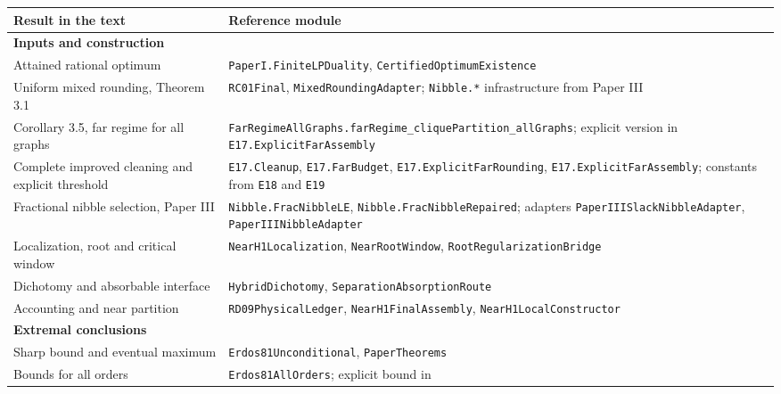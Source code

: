 \documentclass[english,11pt,a4paper]{article}
\newcounter{none}
\begin{document}
{\def\LTcaptype{none} %
\begin{longtable}[]{@{}
  >{\raggedright\arraybackslash}p{}
  >{\raggedright\arraybackslash}p{}@{}}
\toprule\noalign{}
\begin{minipage}[b]{\linewidth}\raggedright
Result in the text
\end{minipage} & \begin{minipage}[b]{\linewidth}\raggedright
Reference module
\end{minipage} \\
\midrule\noalign{}
\endhead
\bottomrule\noalign{}
\endlastfoot
\textbf{Inputs and construction} & \\
Attained rational optimum & \nolinkurl{PaperI.FiniteLPDuality},
\nolinkurl{CertifiedOptimumExistence} \\
Uniform mixed rounding, Theorem 3.1 & \nolinkurl{RC01Final},
\nolinkurl{MixedRoundingAdapter}; \nolinkurl{Nibble.*} infrastructure from
Paper III \\
Corollary 3.5, far regime for all graphs &
\nolinkurl{FarRegimeAllGraphs.farRegime_cliquePartition_allGraphs};
explicit version in \nolinkurl{E17.ExplicitFarAssembly} \\
Complete improved cleaning and explicit threshold &
\nolinkurl{E17.Cleanup}, \nolinkurl{E17.FarBudget},
\nolinkurl{E17.ExplicitFarRounding}, \nolinkurl{E17.ExplicitFarAssembly};
constants from \nolinkurl{E18} and \nolinkurl{E19} \\
Fractional nibble selection, Paper III & \nolinkurl{Nibble.FracNibbleLE},
\nolinkurl{Nibble.FracNibbleRepaired}; adapters
\nolinkurl{PaperIIISlackNibbleAdapter}, \nolinkurl{PaperIIINibbleAdapter} \\
Localization, root and critical window & \nolinkurl{NearH1Localization},
\nolinkurl{NearRootWindow}, \nolinkurl{RootRegularizationBridge} \\
Dichotomy and absorbable interface & \nolinkurl{HybridDichotomy},
\nolinkurl{SeparationAbsorptionRoute} \\
Accounting and near partition & \nolinkurl{RD09PhysicalLedger},
\nolinkurl{NearH1FinalAssembly}, \nolinkurl{NearH1LocalConstructor} \\
\textbf{Extremal conclusions} & \\
Sharp bound and eventual maximum & \nolinkurl{Erdos81Unconditional},
\nolinkurl{PaperTheorems} \\
Bounds for all orders & \nolinkurl{Erdos81AllOrders}; explicit bound in

\end{longtable}}
\end{document}

